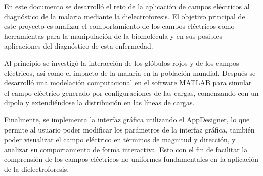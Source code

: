 \tab En este documento se desarrolló el reto de la aplicación de campos eléctricos al diagnóstico de la malaria mediante la dielectroforesis. El objetivo principal de este proyecto es analizar el comportamiento de los campos eléctricos como herramientas para la manipulación de la biomolécula y en sus posibles aplicaciones del diagnóstico de esta enfermedad.

\tab Al principio se investigó la interacción de los glóbulos rojos y de los campos eléctricos, así como el impacto de la malaria en la población mundial. Después se desarrolló una modelación computacional en el software MATLAB para simular el campo eléctrico generado por configuraciones de las cargas, comenzando con un dipolo y extendiéndose la distribución en las líneas de cargas.

\tab Finalmente, se implementa la interfaz gráfica utilizando el AppDesigner, lo que permite al usuario poder modificar los parámetros de la interfaz gráfica, también poder visualizar el campo eléctrico en términos de magnitud y dirección, y analizar su comportamiento de forma interactiva. Esto con el fin de facilitar la comprensión de los campos eléctricos no uniformes fundamentales en la aplicación de la dielectroforesis.
